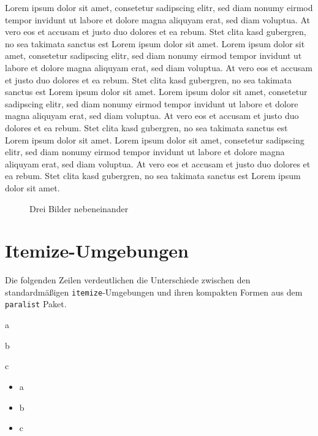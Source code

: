 Lorem ipsum dolor sit amet, consetetur sadipscing elitr, sed diam nonumy eirmod tempor invidunt ut labore et dolore magna aliquyam erat, sed diam voluptua. At vero eos et accusam et justo duo dolores et ea rebum. Stet clita kasd gubergren, no sea takimata sanctus est Lorem ipsum dolor sit amet. Lorem ipsum dolor sit amet, consetetur sadipscing elitr, sed diam nonumy eirmod tempor invidunt ut labore et dolore magna aliquyam erat, sed diam voluptua. At vero eos et accusam et justo duo dolores et ea rebum. Stet clita kasd gubergren, no sea takimata sanctus est Lorem ipsum dolor sit amet. Lorem ipsum dolor sit amet, consetetur sadipscing elitr, sed diam nonumy eirmod tempor invidunt ut labore et dolore magna aliquyam erat, sed diam voluptua. At vero eos et accusam et justo duo dolores et ea rebum. Stet clita kasd gubergren, no sea takimata sanctus est Lorem ipsum dolor sit amet. Lorem ipsum dolor sit amet, consetetur sadipscing elitr, sed diam nonumy eirmod tempor invidunt ut labore et dolore magna aliquyam erat, sed diam voluptua. At vero eos et accusam et justo duo dolores et ea rebum. Stet clita kasd gubergren, no sea takimata sanctus est Lorem ipsum dolor sit amet.

\begin{figure}[b]
  \centering
  \subfloat[Bild 1]{\rule{5cm}{3cm}\quad}             
  \subfloat[Bild 2]{\rule{5cm}{3cm}\quad} 
  \subfloat[Bild 3]{\rule{5cm}{3cm}}
  \caption{Drei Bilder nebeneinander}
  \label{fig:subfig}
\end{figure}

\section{Itemize-Umgebungen}\label{sec:itemize}

Die folgenden Zeilen verdeutlichen die Unterschiede zwischen den standardmäßigen \texttt{itemize}-Umgebungen und ihren kompakten Formen aus dem \texttt{paralist} Paket.

\begin{compactitem}
\item a
\item b
\item c
\end{compactitem}

\begin{itemize}
\item a
\item b
\item c
\end{itemize}

